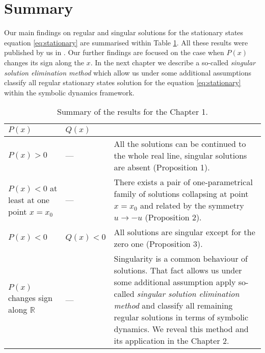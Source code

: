 \section{Summary}

Our main findings on regular and singular solutions for the stationary states equation \eqref{eq:stationary} are summarised within Table \ref{tab:first-chapter-results}.
All these results were published by us in \cite{AlfimovLebedev}.
Our further findings are focused on the case when $P(x)$ changes its sign along the $x$.
In the next chapter we describe a so-called {\it singular solution elimination method} which allow us under some additional assumptions classify all regular stationary states solution for the equation \eqref{eq:stationary} within the symbolic dynamics framework.

\begin{table}[h!]
	\centering
	\begin{tabular}{ | p{4cm} | l || p{10cm} | }
		\hline
		$P(x)$ & $Q(x)$ & \\
		\hline
		$P(x) > 0$ & --- & All the solutions can be continued to the whole real line, singular solutions are absent (Proposition 1). \\
		\hline
		$P(x) < 0$ at least at one point $x = x_0$ & --- & There exists a pair of one-parametrical family of solutions collapsing at point $x = x_0$ and related by the symmetry $u \to -u$ (Proposition 2). \\
		\hline
		$P(x) < 0$ & $Q(x) < 0$ & All solutions are singular except for the zero one (Proposition 3). \\
		\hline
		$P(x)$ changes sign along $\mathbb{R}$ & --- & Singularity is a common behaviour of solutions.
		That fact allows us under some additional assumption apply so-called {\it singular solution elimination method} and classify all remaining regular solutions in terms of symbolic dynamics.
		We reveal this method and its application in the Chapter 2. \\
		\hline
	\end{tabular}
	\caption{Summary of the results for the Chapter 1.}
	\label{tab:first-chapter-results}
\end{table}
